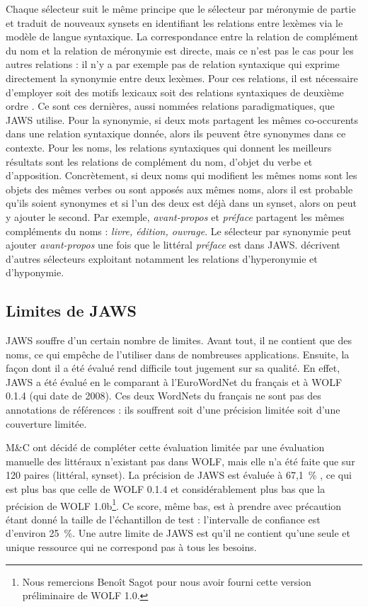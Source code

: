 Chaque sélecteur suit le même principe que le sélecteur par méronymie de partie et traduit de nouveaux synsets en identifiant les relations entre lexèmes via le modèle de langue syntaxique. La correspondance entre la relation de complément du nom et la relation de méronymie est directe, mais ce n'est pas le cas pour les autres relations : il n'y a par exemple pas de relation syntaxique qui exprime directement la synonymie entre deux lexèmes. Pour ces relations, il est nécessaire d'employer soit des motifs lexicaux \citep{hearst1992automatic} soit des relations syntaxiques de deuxième ordre \citep{lenci2012identifying}. Ce sont ces dernières, aussi nommées relations paradigmatiques, que JAWS utilise. Pour la synonymie, si deux mots partagent les mêmes co-occurents dans une relation syntaxique donnée, alors ils peuvent être synonymes dans ce contexte. Pour les noms, les relations syntaxiques qui donnent les meilleurs résultats sont les relations de complément du nom, d'objet du verbe et d'apposition. Concrètement, si deux noms qui modifient les mêmes noms sont les objets des mêmes verbes ou sont apposés aux mêmes noms, alors il est probable qu'ils soient synonymes et si l'un des deux est déjà dans un synset, alors on peut y ajouter le second. Par exemple, \textit{avant-propos} et \textit{préface} partagent les mêmes compléments du noms : \textit{livre, édition, ouvrage}. Le sélecteur par synonymie peut ajouter \textit{avant-propos} une fois que le littéral \textit{préface} est dans JAWS. \citep{mouton2010jaws,mouton2010phd} décrivent d'autres sélecteurs exploitant notamment les relations d'hyperonymie et d'hyponymie.

\subsection{Limites de JAWS}
\label{subsec:limitations}

JAWS souffre d'un certain nombre de limites. Avant tout, il ne contient que des noms, ce qui empêche de l'utiliser dans de nombreuses applications. Ensuite, la façon dont il a été évalué rend difficile tout jugement sur sa qualité. En effet, JAWS a été évalué en le comparant à l'EuroWordNet du français et à WOLF 0.1.4 (qui date de 2008). Ces deux WordNets du français ne sont pas des annotations de références : ils souffrent soit d'une précision limitée soit d'une couverture limitée.

M\&C ont décidé de compléter cette évaluation limitée par une évaluation manuelle des littéraux n'existant pas dans WOLF, mais elle n'a été faite que sur 120 paires (littéral, synset). La précision de JAWS est évaluée à 67,1~\% \citep{mouton2010phd}, ce qui est plus bas que celle de WOLF 0.1.4 et considérablement plus bas que la précision de WOLF 1.0b\footnote{Nous remercions Benoît Sagot pour nous avoir fourni cette version préliminaire de WOLF 1.0.}. Ce score, même bas, est à prendre avec précaution étant donné la taille de l'échantillon de test : l'intervalle de confiance est d'environ 25~\%. Une autre limite de JAWS est qu'il ne contient qu'une seule et unique ressource qui ne correspond pas à tous les besoins.

